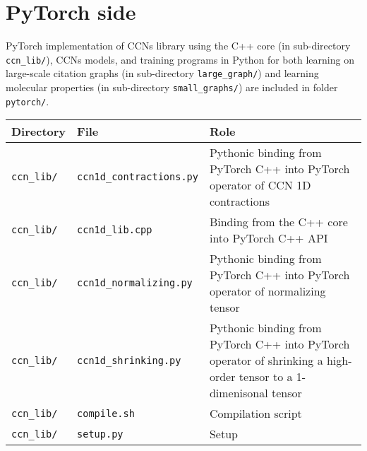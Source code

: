 \documentclass[12pt]{article}
\begin{document}
\clearpage

\section{PyTorch side}

PyTorch implementation of CCNs library using the C++ core (in sub-directory \texttt{ccn\_lib/}), CCNs models, and training programs in Python for both learning on large-scale citation graphs (in sub-directory \texttt{large\_graph/}) and learning molecular properties (in sub-directory \texttt{small\_graphs/}) are included in folder \texttt{pytorch/}.

\begin{center}
\begin{tabular}{| p{} | p{} | p{} |}
\hline
\textbf{Directory} & \textbf{File} & \textbf{Role} \\
\hline
\texttt{ccn\_lib/}
&
\texttt{ccn1d\_contractions.py}
&
Pythonic binding from PyTorch C++ into PyTorch operator of CCN 1D contractions
\\
\hline
\texttt{ccn\_lib/}
&
\texttt{ccn1d\_lib.cpp}
&
Binding from the C++ core into PyTorch C++ API
\\
\hline
\texttt{ccn\_lib/}
&
\texttt{ccn1d\_normalizing.py}
&
Pythonic binding from PyTorch C++ into PyTorch operator of normalizing tensor
\\
\hline
\texttt{ccn\_lib/}
&
\texttt{ccn1d\_shrinking.py}
&
Pythonic binding from PyTorch C++ into PyTorch operator of shrinking a high-order tensor to a 1-dimenisonal tensor
\\
\hline
\texttt{ccn\_lib/}
&
\texttt{compile.sh}
&
Compilation script
\\
\hline
\texttt{ccn\_lib/}
&
\texttt{setup.py}
&
Setup
\\
\hline
\end{tabular}
\end{center}
\end{document}
